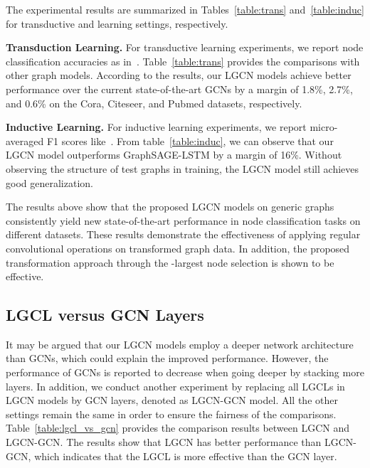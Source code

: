 \documentclass[sigconf]{acmart}
\begin{document}
The experimental results are summarized in Tables~\ref{table:trans}
and~\ref{table:induc} for transductive and learning settings,
respectively.


\textbf{Transduction Learning.} For transductive learning
experiments, we report node classification accuracies as
in~\cite{kipf2016semi}. Table~\ref{table:trans} provides the
comparisons with other graph models. According to the results, our
LGCN models achieve better performance over the current
state-of-the-art GCNs by a margin of 1.8\%, 2.7\%, and 0.6\% on the
Cora, Citeseer, and Pubmed datasets, respectively.


\textbf{Inductive Learning.} For inductive learning experiments, we
report micro-averaged F1 scores like~\cite{hamilton2017inductive}.
From table~\ref{table:induc}, we can observe that our LGCN model
outperforms GraphSAGE-LSTM by a margin of 16\%. Without observing
the structure of test graphs in training, the LGCN model still
achieves good generalization.


The results above show that the proposed LGCN models on generic
graphs consistently yield new state-of-the-art performance in node
classification tasks on different datasets. These results
demonstrate the effectiveness of applying regular convolutional
operations on transformed graph data. In addition, the proposed
transformation approach through the -largest node selection is
shown to be effective.


\subsection{LGCL versus GCN Layers}


It may be argued that our LGCN models employ a deeper network
architecture than GCNs, which could explain the improved
performance. However, the performance of GCNs is reported to
decrease when going deeper by stacking more layers. In addition, we
conduct another experiment by replacing all LGCLs in LGCN models by
GCN layers, denoted as LGCN-GCN model. All the other
settings remain the same in order to ensure the fairness of the
comparisons. Table~\ref{table:lgcl_vs_gcn} provides the comparison
results between LGCN and LGCN-GCN. The results show
that LGCN has better performance than LGCN-GCN,
which indicates that the LGCL is more effective than the GCN layer.
\end{document}
